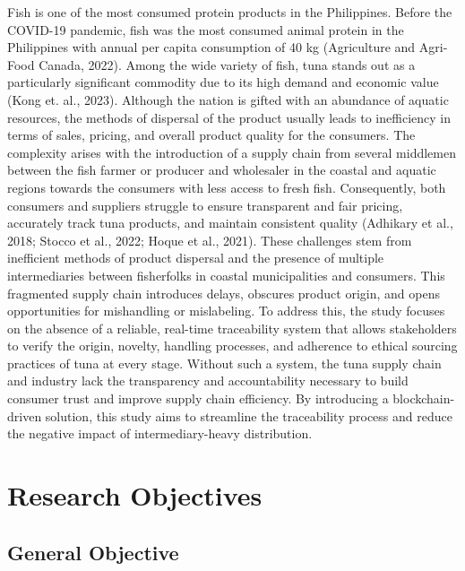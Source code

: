 Fish is one of the most consumed protein products in the Philippines. Before the COVID-19 pandemic, fish was the most consumed animal protein in the Philippines with annual per capita consumption of 40 kg (Agriculture and Agri-Food Canada, 2022). Among the wide variety of fish, tuna stands out as a particularly significant commodity due to its high demand and economic value (Kong et. al., 2023)\nocite{intro-4}. Although the nation is gifted with an abundance of aquatic resources, the methods of dispersal of the product usually leads to inefficiency in terms of sales, pricing, and overall product quality for the consumers. The complexity arises with the introduction of a supply chain from several middlemen between the fish farmer or producer and wholesaler in the coastal and aquatic regions towards the consumers with less access to fresh fish. Consequently, both consumers and suppliers struggle to ensure transparent and fair pricing, accurately track tuna products, and maintain consistent quality (Adhikary et al., 2018; Stocco et al., 2022; Hoque et al., 2021)\nocite{intro-5}\nocite{intro-6}\nocite{intro-7}. These challenges stem from inefficient methods of product dispersal and the presence of multiple intermediaries between fisherfolks in coastal municipalities and consumers. This fragmented supply chain introduces delays, obscures product origin, and opens opportunities for mishandling or mislabeling. To address this, the study focuses on the absence of a reliable, real-time traceability system that allows stakeholders to verify the origin, novelty, handling processes, and adherence to ethical sourcing practices of tuna at every stage. Without such a system, the tuna supply chain and industry lack the transparency and accountability necessary to build consumer trust and improve supply chain efficiency. By introducing a blockchain-driven solution, this study aims to streamline the traceability process and reduce the negative impact of intermediary-heavy distribution.



\section{Research Objectives}
\label{sec:researchobjectives}

\subsection{General Objective}
\label{sec:generalobjective}


